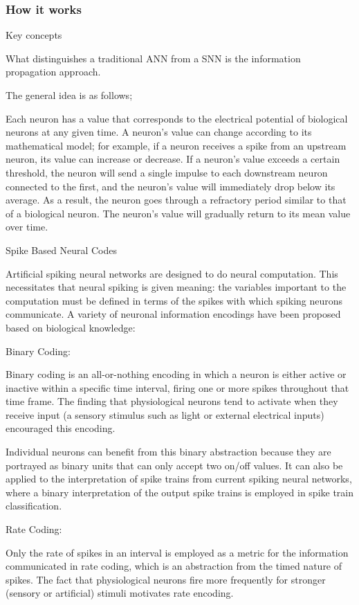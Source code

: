\documentclass[11pt]{article}
\begin{document}
\subsubsection{How it works}
{\color{blue}
  Key concepts

  What distinguishes a traditional ANN from a SNN is the information propagation approach.

  The general idea is as follows;

  Each neuron has a value that corresponds to the electrical potential of biological neurons at any given time.
  A neuron's value can change according to its mathematical model; for example, if a neuron receives a spike from an upstream neuron, its value can increase or decrease.
  If a neuron's value exceeds a certain threshold, the neuron will send a single impulse to each downstream neuron connected to the first, and the neuron's value will immediately drop below its average.
  As a result, the neuron goes through a refractory period similar to that of a biological neuron. The neuron's value will gradually return to its mean value over time.

  Spike Based Neural Codes

  Artificial spiking neural networks are designed to do neural computation. This necessitates that neural spiking is given meaning: the variables important to the computation must be defined in terms of the spikes with which spiking neurons communicate. A variety of neuronal information encodings have been proposed based on biological knowledge:

  Binary Coding:

  Binary coding is an all-or-nothing encoding in which a neuron is either active or inactive within a specific time interval, firing one or more spikes throughout that time frame. The finding that physiological neurons tend to activate when they receive input (a sensory stimulus such as light or external electrical inputs) encouraged this encoding.

  Individual neurons can benefit from this binary abstraction because they are portrayed as binary units that can only accept two on/off values. It can also be applied to the interpretation of spike trains from current spiking neural networks, where a binary interpretation of the output spike trains is employed in spike train classification.

  Rate Coding:

  Only the rate of spikes in an interval is employed as a metric for the information communicated in rate coding, which is an abstraction from the timed nature of spikes. The fact that physiological neurons fire more frequently for stronger (sensory or artificial) stimuli motivates rate encoding.

}
\end{document}
